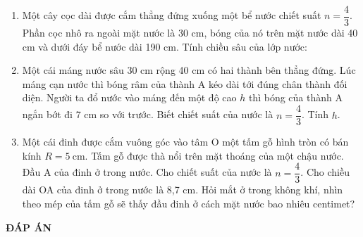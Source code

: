 \begin{enumerate}
	\item{ Một cây cọc dài được cắm thẳng đứng xuống một bể nước chiết suất $n = \dfrac{4}{3}$. Phần cọc nhô ra ngoài mặt nước là 30 cm, bóng của nó trên mặt nước dài 40 cm và dưới đáy bể nước dài 190 cm. Tính chiều sâu của lớp nước:
	}
	\item{ Một cái máng nước sâu 30 cm rộng 40 cm có hai thành bên thẳng đứng. Lúc máng cạn nước thì bóng râm của thành A kéo dài tới đúng chân thành đối diện. Người ta đổ nước vào máng đến một độ cao $h$ thì bóng của thành A ngắn bớt đi 7 cm so với trước. Biết chiết suất của nước là $n = \dfrac{4}{3}$. Tính $h$.
	}
	\item{ Một cái đinh được cắm vuông góc vào tâm O một tấm gỗ hình tròn có bán kính $R = 5\ \text{cm}$. Tấm gỗ được thà nổi trên mặt thoáng của một chậu nước. Đầu A của đinh ở trong nước. Cho chiết suất của nước là $n = \dfrac{4}{3}$. Cho chiều dài OA của đinh ở trong nước là 8,7 cm. Hỏi mắt ở trong không khí, nhìn theo mép của tấm gỗ sẽ thấy đầu đinh ở cách mặt nước bao nhiêu centimet?
	}
	
\end{enumerate}
\textbf{ĐÁP ÁN}
